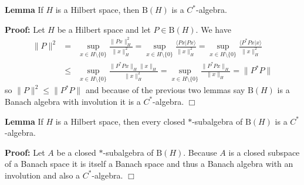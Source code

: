\documentclass[12pt]{article}
\newenvironment{lm}{\par\noindent\textbf{Lemma }}{}
\newenvironment{prf}{\par\noindent\textbf{Proof: }}{$\Box$}
\begin{document}
\begin{lm}
If $H$ is a Hilbert space, then $\mathrm{B}(H)$ is a $C^*$-algebra.
\end{lm}
\begin{prf}
Let $H$ be a Hilbert space and let $P \in \mathrm{B}(H)$. We have
\begin{eqnarray*}
\|P\|^2 &=& \sup_{x \in H \setminus \{0\}} \frac{\|Px\|_H^2}{\|x\|_H^2} = \sup_{x \in H \setminus \{0\}} \frac{\langle Px | Px \rangle}{\|x\|_H^2} = \sup_{x \in H \setminus \{0\}} \frac{\langle P^*Px | x \rangle}{\|x\|_H^2}\\
&\le& \sup_{x \in H \setminus \{0\}} \frac{\|P^*Px\|_H \|x\|_H}{\|x\|_H^2} = \sup_{x \in H \setminus \{0\} } \frac{\| P^*Px \|_H}{\| x \|_H} = \|P^*P\|
\end{eqnarray*}
so $\|P\|^2 \le \|P^*P\|$ and because of the previous two lemmas say $\mathrm{B}(H)$ is a Banach algebra with involution it is a $C^*$-algebra.
\end{prf}

\begin{lm}
If $H$ is a Hilbert space, then every closed $*$-subalgebra of $\mathrm{B}(H)$ is a $C^*$-algebra.
\end{lm}
\begin{prf}
Let $A$ be a closed $*$-subalgebra of $\mathrm{B}(H)$. Because $A$ is a closed subspace of a Banach space it is itself a Banach space and thus a Banach algebra with an involution and also a $C^*$-algebra.
\end{prf}
\end{document}
